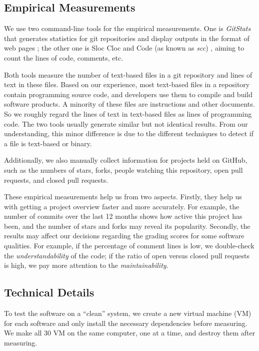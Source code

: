 \subsection{Empirical Measurements}
\label{sec_empirical_measurements}

We use two command-line tools for the empirical measurements. One is \textit{GitStats} that generates statistics for git repositories and display outputs in the format of web pages \cite{Gieniusz2019}; the other one is Sloc Cloc and Code (as known as \textit{scc}) \cite{Boyter2021}, aiming to count the lines of code, comments, etc.

Both tools measure the number of text-based files in a git repository and lines of text in these files. Based on our experience, most text-based files in a repository contain programming source code, and developers use them to compile and build software products. A minority of these files are instructions and other documents. So we roughly regard the lines of text in text-based files as lines of programming code. The two tools usually generate similar but not identical results. From our understanding, this minor difference is due to the different techniques to detect if a file is text-based or binary.

Additionally, we also manually collect information for projects held on GitHub, such as the numbers of stars, forks, people watching this repository, open pull requests, and closed pull requests.

These empirical measurements help us from two aspects. Firstly, they help us with getting a project overview faster and more accurately. For example, the number of commits over the last 12 months shows how active this project has been, and the number of stars and forks may reveal its popularity. Secondly, the results may affect our decisions regarding the grading scores for some software qualities. For example, if the percentage of comment lines is low, we double-check the \textit{understandability} of the code; if the ratio of open versus closed pull requests is high, we pay more attention to the \textit{maintainability}.

\subsection{Technical Details}
\label{sec_technical_details}
To test the software on a ``clean'' system, we create a new virtual machine (VM) for each software and only install the necessary dependencies before measuring. We make all 30 VM on the same computer, one at a time, and destroy them after measuring.


